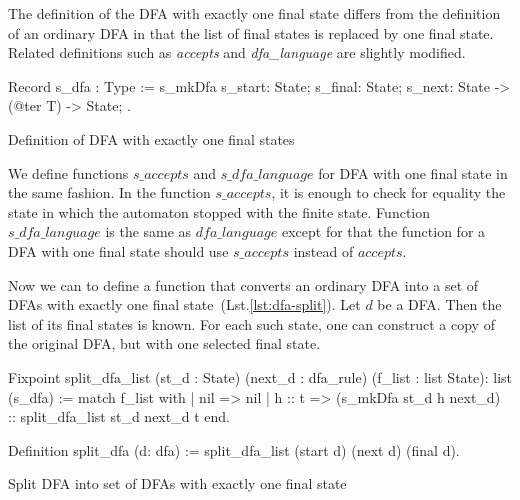 
The definition of the  DFA with exactly one final state differs from the definition of an ordinary DFA in that the list of final states is replaced by one final state. 
Related definitions such as \textit{accepts} and \textit{dfa\_language} are slightly modified.


\begin{listing}[h]
    \begin{pyglist}[language=coq, numbers=none, numbersep=5pt]
  Record s_dfa : Type :=
    s_mkDfa {
      s_start: State;
      s_final: State;
      s_next: State -> (@ter T) -> State;
  }.      
    \end{pyglist}
    \caption{Definition of DFA with exactly one final states}
    \label{lst:dfa-one-ss}
\end{listing}
  
We define functions $\textit{s\_accepts}$ and $\textit{s\_dfa\_language}$ for DFA with one final state in the same fashion.
In the function $\textit{s\_accepts}$, it is enough to check for equality the state in which the automaton stopped with the finite state. Function $\textit{s\_dfa\_language}$ is the same as  $\textit{dfa\_language}$ except for that the function for a DFA with one final state should use $\textit{s\_accepts}$ instead of $\textit{accepts}$.



Now we can to define a function that converts an ordinary DFA into a set of DFAs with exactly one final state~(Lst.\ref{lst:dfa-split}).
Let $d$ be a DFA. Then the list of its final states is known. 
For each such state, one can construct a copy of the original DFA, but with one selected final state.

\begin{listing}[h]
    \begin{pyglist}[language=coq, numbers=none, numbersep=5pt]
  Fixpoint split_dfa_list 
      (st_d : State) 
      (next_d : dfa_rule) 
      (f_list : list State): list (s_dfa) :=
    match f_list with
    | nil => nil
    | h :: t => (s_mkDfa st_d h next_d) 
                :: split_dfa_list st_d next_d t
    end.    
 
 Definition split_dfa (d: dfa) := 
   split_dfa_list (start d) (next d) (final d).
    \end{pyglist}
    \caption{Split DFA into set of DFAs with exactly one final state}
    \label{lst:dfa-split}
\end{listing}


